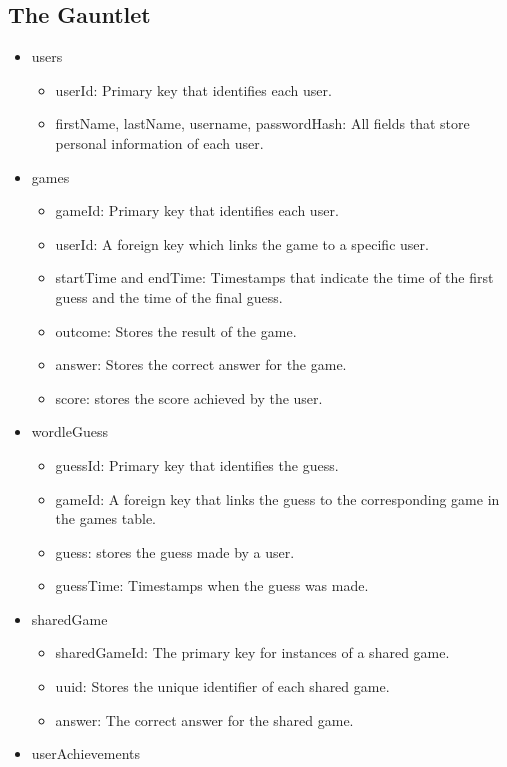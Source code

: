 \subsection{The Gauntlet}
\begin{itemize}
\item users
    \begin{itemize}
    \item userId: Primary key that identifies each user.
    \item firstName, lastName, username, passwordHash: All fields that store personal information of each user.
    \end{itemize}
\item games
    \begin{itemize}
    \item gameId: Primary key that identifies each user.
    \item userId: A foreign key which links the game to a specific user.
    \item startTime and endTime: Timestamps that indicate the time of the first guess and the time of the final guess.
    \item outcome: Stores the result of the game.
    \item answer: Stores the correct answer for the game.
    \item score: stores the score achieved by the user.
    \end{itemize}
\item wordleGuess
    \begin{itemize}
    \item guessId: Primary key that identifies the guess.
    \item gameId: A foreign key that links the guess to the corresponding game in the games table.
    \item guess: stores the guess made by a user.
    \item guessTime: Timestamps when the guess was made.
    \end{itemize}
\item sharedGame
    \begin{itemize}
    \item sharedGameId: The primary key for instances of a shared game.
    \item uuid: Stores the unique identifier of each shared game.
    \item answer: The correct answer for the shared game.
    \end{itemize}
\item userAchievements

\end{itemize}
